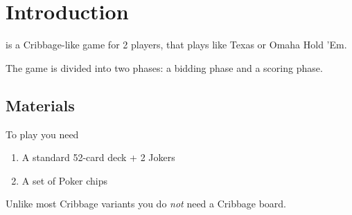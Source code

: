 \section{Introduction}

\name{} is a Cribbage-like game for 2 players, that plays like Texas or Omaha Hold 'Em.

The game is divided into two phases: a bidding phase and a scoring phase. 

\subsection{Materials}
To play \name{} you need

\begin{enumerate}
    \item A standard 52-card deck + 2 Jokers
    \item A set of Poker chips
\end{enumerate}

\note Unlike most Cribbage variants you do \textit{not} need a Cribbage board.